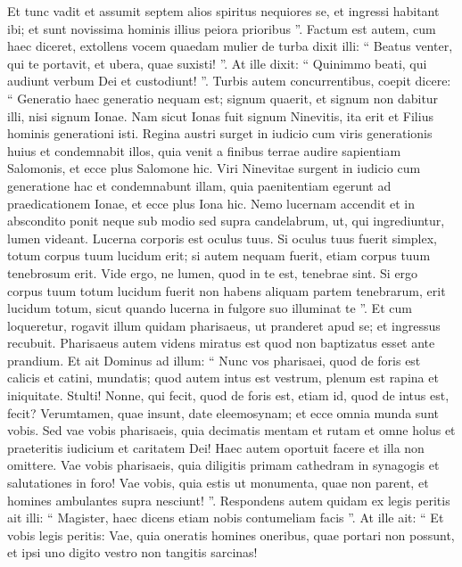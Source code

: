 \begin{biblechapter}
\begin{biblechapter}
\begin{biblechapter}
\begin{biblechapter}
\begin{biblechapter}
\begin{biblechapter}
\begin{biblechapter}
\begin{biblechapter}
\begin{biblechapter}
\begin{biblechapter}
\begin{biblechapter}
\verse Et tunc vadit et assumit septem alios spiritus nequiores se, et ingressi habitant ibi; et sunt novissima hominis illius peiora prioribus ”.
 \verse Factum est autem, cum haec diceret, extollens vocem quaedam mulier de turba dixit illi: “ Beatus venter, qui te portavit, et ubera, quae suxisti! ”. 
\verse At ille dixit: “ Quinimmo beati, qui audiunt verbum Dei et custodiunt! ”.
 \verse Turbis autem concurrentibus, coepit dicere: “ Generatio haec generatio nequam est; signum quaerit, et signum non dabitur illi, nisi signum Ionae. 
\verse Nam sicut Ionas fuit signum Ninevitis, ita erit et Filius hominis generationi isti. 
 \verse Regina austri surget in iudicio cum viris generationis huius et condemnabit illos, quia venit a finibus terrae audire sapientiam Salomonis, et ecce plus Salomone hic. 
\verse Viri Ninevitae surgent in iudicio cum generatione hac et condemnabunt illam, quia paenitentiam egerunt ad praedicationem Ionae, et ecce plus Iona hic.
 \verse Nemo lucernam accendit et in abscondito ponit neque sub modio sed supra candelabrum, ut, qui ingrediuntur, lumen videant. 
\verse Lucerna corporis est oculus tuus. Si oculus tuus fuerit simplex, totum corpus tuum lucidum erit; si autem nequam fuerit, etiam corpus tuum tenebrosum erit. 
\verse Vide ergo, ne lumen, quod in te est, tenebrae sint. 
\verse Si ergo corpus tuum totum lucidum fuerit non habens aliquam partem tenebrarum, erit lucidum totum, sicut quando lucerna in fulgore suo illuminat te ”.
 \verse Et cum loqueretur, rogavit illum quidam pharisaeus, ut pranderet apud se; et ingressus recubuit. 
\verse Pharisaeus autem videns miratus est quod non baptizatus esset ante prandium. 
\verse Et ait Dominus ad illum: “ Nunc vos pharisaei, quod de foris est calicis et catini, mundatis; quod autem intus est vestrum, plenum est rapina et iniquitate. 
\verse Stulti! Nonne, qui fecit, quod de foris est, etiam id, quod de intus est, fecit? 
\verse Verumtamen, quae insunt, date eleemosynam; et ecce omnia munda sunt vobis. 
\verse Sed vae vobis pharisaeis, quia decimatis mentam et rutam et omne holus et praeteritis iudicium et caritatem Dei! Haec autem oportuit facere et illa non omittere. 
\verse Vae vobis pharisaeis, quia diligitis primam cathedram in synagogis et salutationes in foro! 
\verse Vae vobis, quia estis ut monumenta, quae non parent, et homines ambulantes supra nesciunt! ”.
 \verse Respondens autem quidam ex legis peritis ait illi: “ Magister, haec dicens etiam nobis contumeliam facis ”. 
\verse At ille ait: “ Et vobis legis peritis: Vae, quia oneratis homines oneribus, quae portari non possunt, et ipsi uno digito vestro non tangitis sarcinas! 

\end{biblechapter}
\end{biblechapter}
\end{biblechapter}
\end{biblechapter}
\end{biblechapter}
\end{biblechapter}
\end{biblechapter}
\end{biblechapter}
\end{biblechapter}
\end{biblechapter}
\end{biblechapter}
